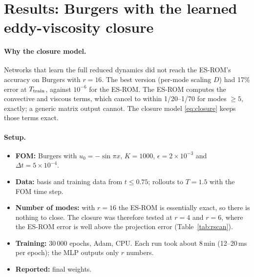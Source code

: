 \documentclass[11pt,a4paper]{article}
\begin{document}
\section{Results: Burgers with the learned eddy-viscosity closure}\label{sec:results}
\paragraph{Why the closure model.} Networks that learn the full reduced dynamics did not reach the ES-ROM's accuracy on Burgers with $r=16$. The best version (per-mode scaling $D$) had 17\% error at $T_{\rm train}$, against $10^{-6}$ for the ES-ROM. The ES-ROM computes the convective and viscous terms, which cancel to within 1/20--1/70 for modes $\ge5$, exactly; a generic matrix output cannot. The closure model \eqref{eq:closure} keeps those terms exact.

\paragraph{Setup.}
\begin{itemize}
\item \textbf{FOM:} Burgers with $u_0=-\sin\pi x$, $K=1000$, $\epsilon=2\times10^{-3}$ and $\Delta t=5\times10^{-4}$.
\item \textbf{Data:} basis and training data from $t\le0.75$; rollouts to $T=1.5$ with the FOM time step.
\item \textbf{Number of modes:} with $r=16$ the ES-ROM is essentially exact, so there is nothing to close. The closure was therefore tested at $r=4$ and $r=6$, where the ES-ROM error is well above the projection error (Table~\ref{tab:rscan}).
\item \textbf{Training:} 30\,000 epochs, Adam, CPU. Each run took about 8\,min (12--20\,ms per epoch); the MLP outputs only $r$ numbers.
\item \textbf{Reported:} final weights.
\end{itemize}
\end{document}
